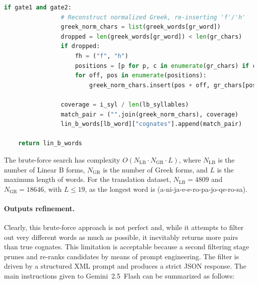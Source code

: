 \begin{lstlisting}[language=Python, caption=Brute-Force matching algorithm, breaklines=true, postbreak=\mbox{\hspace{50pt}\textcolor{red}{$\hookrightarrow$}\space}]
            if gate1 and gate2:
                # Reconstruct normalized Greek, re-inserting 'f'/'h'
                greek_norm_chars = list(greek_words[gr_word])
                dropped = len(greek_words[gr_word]) < len(gr_chars)
                if dropped:
                    fh = ("f", "h")
                    positions = [p for p, c in enumerate(gr_chars) if c in fh]
                    for off, pos in enumerate(positions):
                        greek_norm_chars.insert(pos + off, gr_chars[pos])

                coverage = i_syl / len(lb_syllables)
                match_pair = ("".join(greek_norm_chars), coverage)
                lin_b_words[lb_word]["cognates"].append(match_pair)

    return lin_b_words
\end{lstlisting}

The brute-force search has complexity $O(N_{\text{LB}} \cdot N_{\text{GR}} \cdot L)$, where $N_{\text{LB}}$ is the number of Linear B forms, $N_{\text{GR}}$ is the number of Greek forms, and $L$ is the maximum length of words.
For the translation dataset, $N_{\text{LB}} = 4809$ and $N_{\text{GR}} = 18646$, with $L \leq 19$, as the longest word is \textlinb{\Ba\Bni\Bja\Be\Be\Bro\Bpa\Bjo\Bqe\Bro\Bsa} (a-ni-ja-e-e-ro-pa-jo-qe-ro-sa).

\paragraph{Outputs refinement.}
Clearly, this brute-force approach is not perfect and, while it attempts to filter out very different words as much as possible, it inevitably returns more pairs than true cognates.
This limitation is acceptable because a second filtering stage prunes and re-ranks candidates by means of prompt engineering.
The filter is driven by a structured XML prompt and produces a strict JSON response. The main instructions given to Gemini~2.5~Flash can be summarized as follows:


